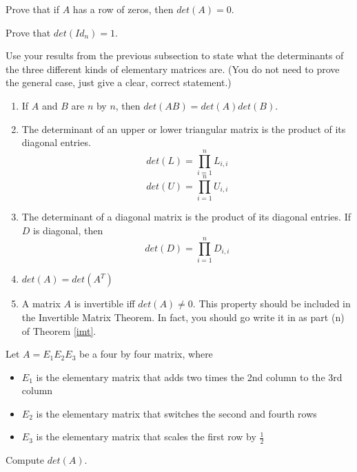 \bq Prove that if $A$ has a row of zeros, then $det(A)=0$.
\eq

\bq Prove that $det(Id_n)=1$.
\eq

\bq Use your results from the previous subsection to state what the determinants of the three different kinds of elementary matrices are. (You do not need to prove the general case, just give a clear, correct statement.)
\eq

\begin{theorem}
\begin{enumerate}
\item If $A$ and $B$ are $n$ by $n$, then $det(AB)=det(A) det(B)$.
\item The determinant of an upper or lower triangular matrix is the product of its diagonal entries. $$det(L)=\prod_{i=1}^n L_{i,i}$$ $$det(U)=\prod_{i=1}^n U_{i,i}$$
\item The determinant of a diagonal matrix is the product of its diagonal entries. If $D$ is diagonal, then $$det(D)=\prod_{i=1}^n D_{i,i}$$
\item $det(A)=det(A^T)$
\item A matrix $A$ is invertible iff $det(A)\neq 0$. This property should be included in the Invertible Matrix Theorem. In fact, you should go write it in as part (n) of Theorem \ref{imt}.
\end{enumerate}
\end{theorem}

\begin{annotation}
\end{annotation}
\bq Let $A=E_1 E_2 E_3$ be a four by four matrix, where
\begin{itemize}
\item $E_1$ is the elementary matrix that adds two times the 2nd column to the 3rd column
\item $E_2$ is the elementary matrix that switches the second and fourth rows
\item $E_3$ is the elementary matrix that scales the first row by $\frac{1}{2}$
\end{itemize}
Compute $det(A)$.
\eq

